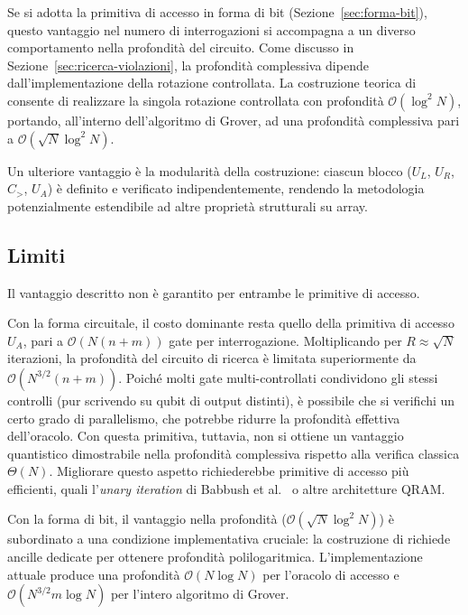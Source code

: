 Se si adotta la primitiva di accesso in forma di bit (Sezione~\ref{sec:forma-bit}), questo vantaggio nel numero di interrogazioni si accompagna a un diverso comportamento nella profondità del circuito. Come discusso in Sezione~\ref{sec:ricerca-violazioni}, la profondità complessiva dipende dall'implementazione della rotazione controllata. La costruzione teorica di \cite{pavone2024rotgate} consente di realizzare la singola rotazione controllata con profondità $\mathcal{O}(\log^2 N)$, portando, all'interno dell'algoritmo di Grover, ad una profondità complessiva pari a $\mathcal{O}(\sqrt{N}\log^2 N)$.

Un ulteriore vantaggio è la modularità della costruzione: ciascun blocco ($U_L$, $U_R$, $C_>$, $U_A$) è definito e verificato indipendentemente, rendendo la metodologia potenzialmente estendibile ad altre proprietà strutturali su array.

\subsection{Limiti}
Il vantaggio descritto non è garantito per entrambe le primitive di accesso.

Con la forma circuitale, il costo dominante resta quello della primitiva di accesso $U_A$, pari a $\mathcal{O}(N(n+m))$ gate per interrogazione. Moltiplicando per $R\approx\sqrt{N}$ iterazioni, la profondità del circuito di ricerca è limitata superiormente da $\mathcal{O}(N^{3/2}(n+m))$. Poiché molti gate multi-controllati condividono gli stessi controlli (pur scrivendo su qubit di output distinti), è possibile che si verifichi un certo grado di parallelismo, che potrebbe ridurre la profondità effettiva dell'oracolo. Con questa primitiva, tuttavia, non si ottiene un vantaggio quantistico dimostrabile nella profondità complessiva rispetto alla verifica classica $\Theta(N)$. Migliorare questo aspetto richiederebbe primitive di accesso più efficienti, quali l'\emph{unary iteration} di Babbush et al.~\cite{Babbush_2018} o altre architetture QRAM.

Con la forma di bit, il vantaggio nella profondità ($\mathcal{O}(\sqrt{N}\log^2 N)$) è subordinato a una condizione implementativa cruciale: la costruzione di \cite{pavone2024rotgate} richiede ancille dedicate per ottenere profondità polilogaritmica. L'implementazione attuale produce una profondità $\mathcal{O}(N\log N)$ per l'oracolo di accesso e $\mathcal{O}(N^{3/2}m\log N)$ per l'intero algoritmo di Grover.


